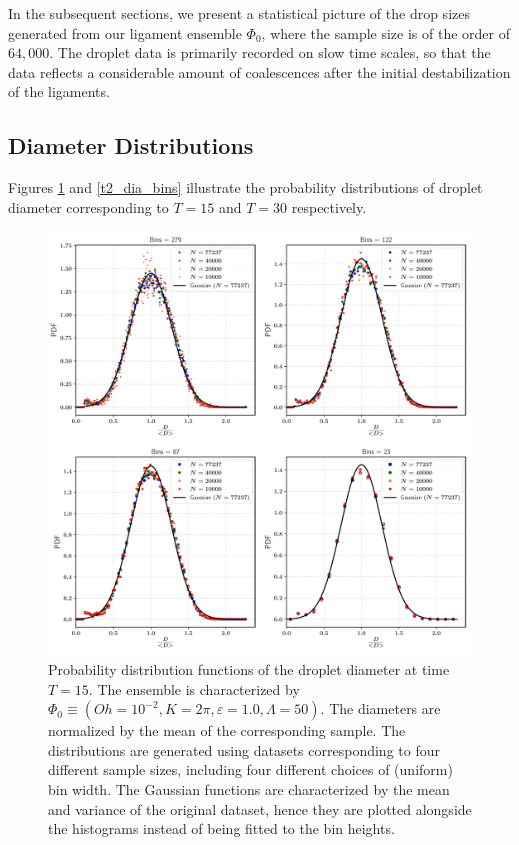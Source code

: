 In the subsequent sections, we present a statistical picture of the drop sizes generated 
from our ligament ensemble $\Phi_0$, where the sample size is of the order of $64,000$.
The droplet data is primarily recorded on slow time scales, so that the data reflects 
a considerable amount of coalescences after the initial destabilization of the ligaments. 

\subsection*{Diameter Distributions}

Figures \ref{t1_dia_bins} and \ref{t2_dia_bins} illustrate the probability distributions
of droplet diameter corresponding to $T=15$ and $T=30$ respectively.  




\begin{figure}
\centering
\includegraphics{plots/drop_stats/short_time_diameter_bins.pdf}
\caption{Probability distribution functions of the droplet diameter at time $T = 15$. 
The ensemble is characterized by $\Phi_0 \equiv \left( Oh = 10^{-2}, K = 2\pi , \varepsilon = 1.0 , \Lambda = 50 \right)$. 
The diameters are normalized by the mean of the corresponding sample.  
The distributions are generated using datasets corresponding to four different sample sizes, 
including four different choices of (uniform) bin width. 
The Gaussian functions are characterized by the mean and variance of the original dataset, 
hence they are plotted alongside the histograms instead of being fitted to the bin heights.
	}
\label{t1_dia_bins}
\end{figure}

